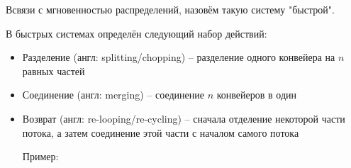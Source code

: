 \vspace{0.25in}

\noindent Всвязи с мгновенностью распределений, назовём такую систему "быстрой".

\vspace{0.4in}

\noindent В быстрых системах определён следующий набор действий:

\begin{itemize}
	\item Разделение (англ: splitting/chopping) -- разделение одного конвейера на $n$ равных частей
	
		
	
	\item Соединение (англ: merging) -- соединение $n$ конвейеров в один
		
	\item Возврат (англ: re-looping/re-cycling) -- сначала отделение некоторой части потока, а затем соединение этой части с началом самого потока
	
		Пример:
		
\end{itemize}

